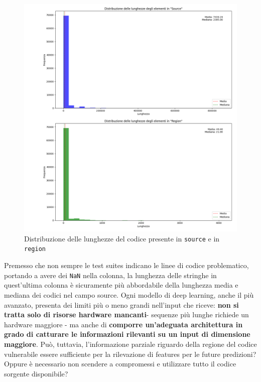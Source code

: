 \documentclass[conference]{IEEEtran}
\begin{document}
\begin{figure}[h]
    \centering
    \includegraphics[width=\columnwidth]{images/ESED/SARD_GENERATE_lenght_source_region.png}
    \caption{Distribuzione delle lunghezze del codice presente in \texttt{source} e in \texttt{region}}
    \label{fig:length-source-region}
\end{figure}

Premesso che non sempre le test suites indicano le linee di codice problematico, portando a avere dei \texttt{NaN} nella colonna, la lunghezza delle stringhe in quest'ultima colonna è sicuramente più abbordabile della lunghezza media e mediana dei codici nel campo source. Ogni modello di deep learning, anche il più avanzato, presenta dei limiti più o meno grandi nell'input che riceve: \textbf{non si tratta solo di risorse hardware mancanti}- sequenze più lunghe richiede un hardware maggiore - ma anche di \textbf{comporre un'adeguata architettura in grado di catturare le informazioni rilevanti su un input di dimensione maggiore}. Può, tuttavia, l'informazione parziale riguardo della regione del codice vulnerabile essere sufficiente per la rilevazione di features per le future predizioni? Oppure è necessario non scendere a compromessi e utilizzare tutto il codice sorgente disponibile?
\end{document}
